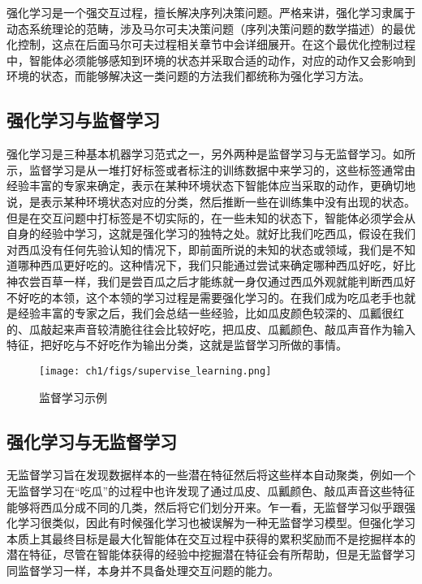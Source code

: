 强化学习是一个强交互过程，擅长解决序列决策问题。严格来讲，强化学习隶属于动态系统理论的范畴，涉及马尔可夫决策问题（序列决策问题的数学描述）的最优化控制，这点在后面马尔可夫过程相关章节中会详细展开。在这个最优化控制过程中，智能体必须能够感知到环境的状态并采取合适的动作，对应的动作又会影响到环境的状态，而能够解决这一类问题的方法我们都统称为强化学习方法。

\subsection{强化学习与监督学习}

强化学习是三种基本机器学习范式之一，另外两种是监督学习与无监督学习。如所示，监督学习是从一堆打好标签或者标注的训练数据中来学习的，这些标签通常由经验丰富的专家来确定，表示在某种环境状态下智能体应当采取的动作，更确切地说，是表示某种环境状态对应的分类，然后推断一些在训练集中没有出现的状态。但是在交互问题中打标签是不切实际的，在一些未知的状态下，智能体必须学会从自身的经验中学习，这就是强化学习的独特之处。就好比我们吃西瓜，假设在我们对西瓜没有任何先验认知的情况下，即前面所说的未知的状态或领域，我们是不知道哪种西瓜更好吃的。这种情况下，我们只能通过尝试来确定哪种西瓜好吃，好比神农尝百草一样，我们是尝百瓜之后才能练就一身仅通过西瓜外观就能判断西瓜好不好吃的本领，这个本领的学习过程是需要强化学习的。在我们成为吃瓜老手也就是经验丰富的专家之后，我们会总结一些经验，比如瓜皮颜色较深的、瓜瓤很红的、瓜敲起来声音较清脆往往会比较好吃，把瓜皮、瓜瓤颜色、敲瓜声音作为输入特征，把好吃与不好吃作为输出分类，这就是监督学习所做的事情。

\begin{figure}[hbt]
    \centering
    \texttt{[image: ch1/figs/supervise\_learning.png]}
    \caption{监督学习示例}
    \label{fig:supervise_learning}
\end{figure}

\subsection{强化学习与无监督学习}

无监督学习旨在发现数据样本的一些潜在特征然后将这些样本自动聚类，例如一个无监督学习在“吃瓜”的过程中也许发现了通过瓜皮、瓜瓤颜色、敲瓜声音这些特征能够将西瓜分成不同的几类，然后将它们划分开来。乍一看，无监督学习似乎跟强化学习很类似，因此有时候强化学习也被误解为一种无监督学习模型。但强化学习本质上其最终目标是最大化智能体在交互过程中获得的累积奖励而不是挖掘样本的潜在特征，尽管在智能体获得的经验中挖掘潜在特征会有所帮助，但是无监督学习同监督学习一样，本身并不具备处理交互问题的能力。


